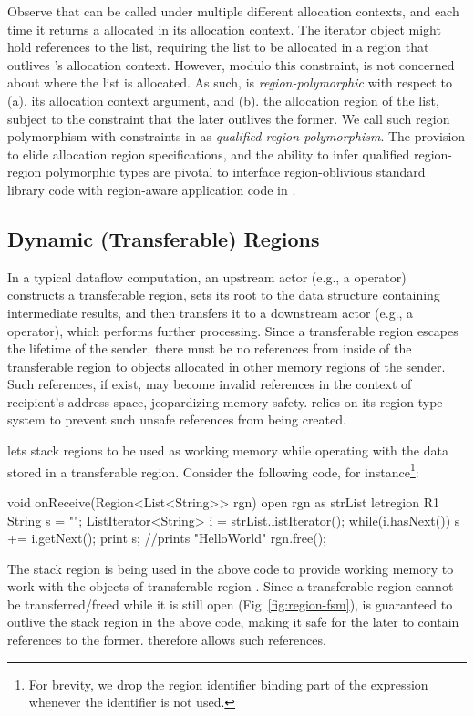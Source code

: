 {Observe that  can be called under multiple different
allocation contexts, and each time it returns a 
allocated in its allocation context. The iterator object might hold
references to the list, requiring the list to be allocated in a region
that outlives \!'s allocation context. However, modulo
this constraint,  is not concerned about where the
list is allocated. As such,  is
\emph{region-polymorphic} with respect to (a). its allocation context
argument, and (b). the allocation region of the list, subject to the
constraint that the later outlives the former. We call such region
polymorphism with constraints in \name as \emph{qualified region
polymorphism}. The provision to elide allocation region
specifications, and the ability to infer qualified region-region
polymorphic types are pivotal to interface region-oblivious standard
library code with region-aware application code in \name. 

\subsection{Dynamic (Transferable) Regions}



In a typical dataflow computation, an upstream actor
(e.g., a  operator) constructs a transferable region, sets
its root to the data structure containing intermediate results, and
then transfers it to a downstream actor (e.g., a  operator),
which performs further processing. Since a transferable region escapes
the lifetime of the sender, there must be no references from inside of
the transferable region to objects allocated in other memory regions
of the sender. Such references, if exist, may become invalid
references in the context of recipient's address space, jeopardizing
memory safety. \name relies on its region type system to prevent such
unsafe references from being created.


\name lets stack regions to be used as working memory while operating
with the data stored in a transferable region. Consider the following
code, for instance\footnote{For brevity, we drop the region identifier binding part of the
 expression whenever the identifier is not used.}:
\begin{codejava}
void onReceive(Region<List<String>> rgn)
  open rgn as strList {
    letregion R1 {
      String s = "";
      ListIterator<String> i = strList.listIterator();
      while(i.hasNext()) {
        s += i.getNext();
      }
      print s; //prints "HelloWorld"
    }
  }
  rgn.free();
\end{codejava}
The stack region  is being used in the above code to provide
working memory to work with the objects of transferable region
. Since a transferable region cannot be transferred/freed while
it is still open (Fig~\ref{fig:region-fsm}),  is guaranteed to
outlive the stack region  in the above code, making it safe for
the later to contain references to the former. \name therefore allows
such references.

}
